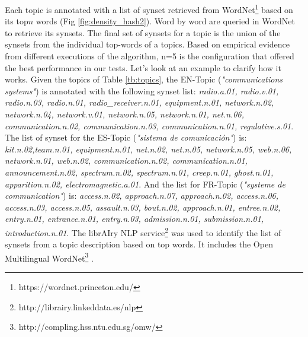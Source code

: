 Each topic is annotated with a list of synset \citep{Bond2013} retrieved from WordNet\footnote{https://wordnet.princeton.edu/}\citep{Miller1995WordNet:English} based on its top$n$ words (Fig \ref{fig:density_hash2}). Word by word are queried in WordNet to retrieve its synsets. The final set of synsets for a topic is the union of the synsets from the individual top-words of a topics. Based on empirical evidence from different executions of the algorithm, n=5 is the configuration that offered the best performance in our tests. Let's look at an example to clarify how it works. Given the topics of Table \ref{tb:topics}, the EN-Topic (\textit{"communications systems"}) is annotated with the following synset list: \textit{radio.a.01, radio.v.01, radio.n.03, radio.n.01, radio\_receiver.n.01, equipment.n.01, network.n.02, network.n.04, network.v.01, network.n.05, network.n.01, net.n.06, communication.n.02, communication.n.03, communication.n.01, regulative.s.01}. The list of synset for the ES-Topic (\textit{"sistema de comunicaci\'on"}) is:  \textit{kit.n.02,team.n.01, equipment.n.01, net.n.02, net.n.05, network.n.05, web.n.06, network.n.01, web.n.02, communication.n.02, communication.n.01, announcement.n.02, spectrum.n.02, spectrum.n.01, creep.n.01, ghost.n.01, apparition.n.02, electromagnetic.a.01}. And the list for FR-Topic (\textit{"systeme de communication"}) is:  \textit{access.n.02, approach.n.07, approach.n.02, access.n.06, access.n.03, access.n.05, assault.n.03, bout.n.02, approach.n.01, entree.n.02, entry.n.01, entrance.n.01, entry.n.03, admission.n.01, submission.n.01, introduction.n.01}. The librAIry NLP service\footnote{http://librairy.linkeddata.es/nlp} was used to identify the list of synsets from a topic description based on top words. It includes the Open Multilingual WordNet\footnote{http://compling.hss.ntu.edu.sg/omw/} \citep{Bond2012}.

